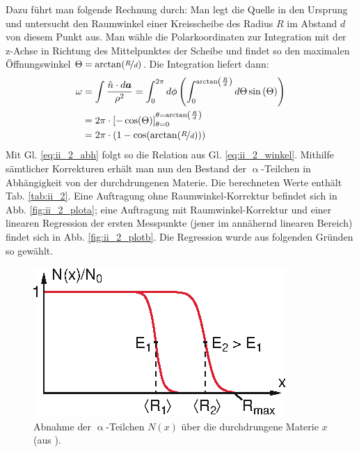 Dazu führt man folgende Rechnung durch: Man legt die Quelle in den Ursprung und untersucht den Raumwinkel einer Kreisscheibe des Radius $R$ im Abstand $d$ von diesem Punkt aus. Man wähle die Polarkoordinaten zur Integration mit der z-Achse in Richtung des Mittelpunktes der Scheibe und findet so den maximalen Öffnungswinkel $\Theta = \arctan(\nicefrac{R}{d})$. Die Integration liefert dann:
\begin{align}
\omega &= \int \frac{\hat{n}\cdot d\vec{a}}{\rho^2} = \int_0^{2 \pi} d\phi \left( \int_0^{\arctan\left(\frac{R}{d}\right)} d\Theta \sin\left(\Theta\right) \right)\nonumber\\
&= 2\pi \cdot \left[ -\cos(\Theta) \right]_{\theta=0}^{\theta=\arctan\left(\frac{R}{d}\right)}\nonumber\\
&= 2\pi \cdot (1-\cos(\arctan(\nicefrac{R}{d})))
\end{align}
Mit Gl. \eqref{eq:ii_2_abh} folgt so die Relation aus Gl. \eqref{eq:ii_2_winkel}. Mithilfe sämtlicher Korrekturen erhält man nun den Bestand der $\upalpha$-Teilchen in Abhängigkeit von der durchdrungenen Materie. Die berechneten Werte enthält Tab. \ref{tab:ii_2}. Eine Auftragung ohne Raumwinkel-Korrektur befindet sich in Abb. \ref{fig:ii_2_plota}; eine Auftragung mit Raumwinkel-Korrektur und einer linearen Regression der ersten Messpunkte (jener im annähernd linearen Bereich) findet sich in Abb. \ref{fig:ii_2_plotb}. Die Regression wurde aus folgenden Gründen so gewählt.

\begin{figure}[tb]
\centering
\includegraphics[scale=1.5]{fig/ii_2_dem.eps}
\caption{Abnahme der $\upalpha$-Teilchen $N(x)$ über die durchdrungene Materie $x$ (aus \cite[S. 90]{Dem10}).}
\label{fig:ii_2_dem}
\end{figure}

